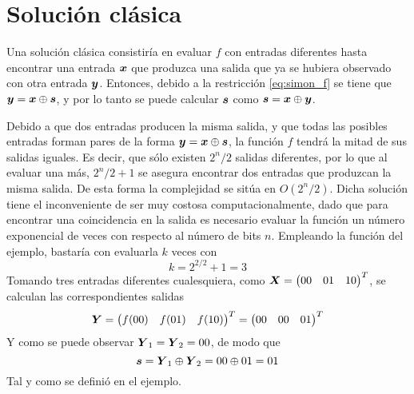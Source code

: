 \section{Solución clásica}

Una solución clásica consistiría en evaluar $f$ con entradas diferentes hasta 
encontrar una entrada $\boldsymbol{x}$ que produzca una salida que ya se hubiera observado 
con otra entrada $\boldsymbol{y}$. Entonces, debido a la restricción \ref{eq:simon_f} se 
tiene que $\boldsymbol{y} = \boldsymbol{x} \oplus \boldsymbol{s}$, y por lo tanto se puede calcular $\boldsymbol{s}$ como $\boldsymbol{s} = 
\boldsymbol{x} \oplus \boldsymbol{y}$.

Debido a que dos entradas producen la misma salida, y que todas las posibles 
entradas forman pares de la forma $\boldsymbol{y} = \boldsymbol{x} \oplus \boldsymbol{s}$, la función $f$ 
tendrá la mitad de sus salidas iguales. Es decir, que sólo existen $2^{n}/2$ 
salidas diferentes, por lo que al evaluar una más, $2^{n}/2 + 1$ se asegura 
encontrar dos entradas que produzcan la misma salida. De esta forma la 
complejidad se sitúa en $O(2^{n}/2)$. Dicha solución tiene el inconveniente de 
ser muy costosa computacionalmente, dado que para encontrar una coincidencia en 
la salida es necesario evaluar la función un número exponencial de veces con 
respecto al número de bits $n$.
%
Empleando la función del ejemplo, bastaría con evaluarla $k$ veces con
$$k = 2^{2/2}+1 = 3$$
Tomando tres entradas diferentes cualesquiera, como $\boldsymbol{X} = \begin{pmatrix} 00 & 01 & 
10 \end{pmatrix}^T$, se calculan las correspondientes salidas
$$ \boldsymbol{Y} = \begin{pmatrix} f(00) & f(01) & f(10) \end{pmatrix}^T = \begin{pmatrix} 00 &00 & 01 \end{pmatrix}^T $$
Y como se puede observar $\boldsymbol{Y}_1 = \boldsymbol{Y}_2 = 00$, de modo que
$$\boldsymbol{s} = \boldsymbol{Y}_1 \oplus \boldsymbol{Y}_2 = 00 \oplus 01 = 01$$
Tal y como se definió en el ejemplo.

